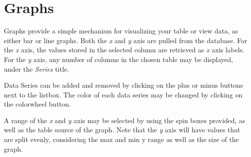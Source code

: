 \section{Graphs}
Graphs provide a simple mechanism for visualizing your table or view data, 
as either bar or line graphs.  Both the \emph{x} and \emph{y} axis are pulled 
from the database.  For the \emph{x} axis, the values stored in the selected 
column are retrieved as \emph{x} axis labels.  For the \emph{y} axis, any 
number of columns in the chosen table may be displayed, under the 
\emph{Series} title.

Data Series can be added and removed by clicking on the plus or minus buttons 
next to the listbox. The color of each data series may be changed by clicking 
on the colorwheel button.

A range of the \emph{x} and \emph{y} axis may be selected by using the spin 
boxes provided, as well as the table source of the graph.  Note that the 
\emph{y} axis will have values that are split evenly, considering the max 
and min y range as well as the size of the graph.
